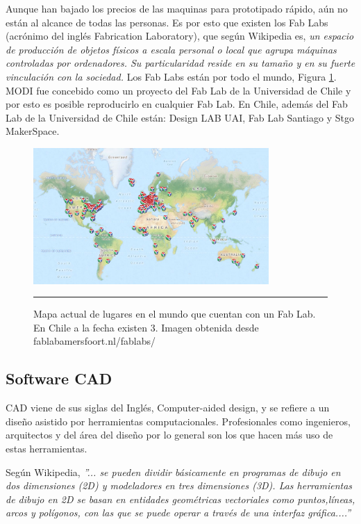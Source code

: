 Aunque han bajado los precios de las maquinas para prototipado rápido, aún no están al alcance de todas las personas. Es por esto que existen los Fab Labs (acrónimo del inglés Fabrication Laboratory), que según Wikipedia es, \textit{un espacio de producción de objetos físicos a escala personal o local que agrupa máquinas controladas por ordenadores. Su particularidad reside en su tamaño y en su fuerte vinculación con la sociedad.} Los Fab Labs están por todo el mundo, Figura \ref{fig:Fablabs}. MODI fue concebido como un proyecto del Fab Lab de la Universidad de Chile y por esto es posible reproducirlo en cualquier Fab Lab. En Chile, además del Fab Lab de la Universidad de Chile están: Design LAB UAI, Fab Lab Santiago y Stgo MakerSpace. 

\begin{figure}[htbp]
	\centering
		\includegraphics[width=0.8\textwidth]{./Figures/map.png}
		\rule{35em}{0.5pt}
	\caption[Fablabs]{Mapa actual de lugares en el mundo que cuentan con un Fab Lab. En Chile a la fecha existen 3. Imagen obtenida desde fablabamersfoort.nl/fablabs/}
	\label{fig:Fablabs}
\end{figure}	

\subsection{Software CAD}

CAD viene de sus siglas del Inglés, Computer-aided design, y se refiere a un diseño asistido por herramientas computacionales. Profesionales como ingenieros, arquitectos y del área del diseño por lo general son los que hacen más uso de estas herramientas.

Según Wikipedia, \textit{”... se pueden dividir básicamente en programas de dibujo en dos dimensiones (2D) y modeladores en tres dimensiones (3D). Las herramientas de dibujo en 2D se basan en entidades geométricas vectoriales como puntos,líneas, arcos y polígonos, con las que se puede operar a través de una interfaz gráfica....”}

